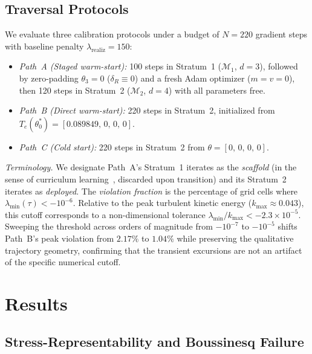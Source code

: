 \documentclass[preprint,aps,prb,longbibliography,superscriptaddress]{revtex4-2}
\begin{document}
\subsection{Traversal Protocols}\label{sec:protocols}

We evaluate three calibration protocols under a budget of $N = 220$ gradient
steps with baseline penalty $\lambda_{\mathrm{realiz}} = 150$:
\begin{itemize}
  \item \textit{Path~A (Staged warm-start):} 100 steps in Stratum~1
    ($\mathcal{M}_1$, $d=3$), followed by zero-padding $\theta_3 = 0$
    ($\delta_R \equiv 0$) and a fresh Adam optimizer ($m = v = 0$), then
    120 steps in Stratum~2 ($\mathcal{M}_2$, $d=4$) with all parameters free.
  \item \textit{Path~B (Direct warm-start):} 220 steps in Stratum~2,
    initialized from $T_e(\theta_0^*) = [0.089849,\, 0,\, 0,\, 0]$.
  \item \textit{Path~C (Cold start):} 220 steps in Stratum~2 from
    $\theta = [0,\, 0,\, 0,\, 0]$.
\end{itemize}

\emph{Terminology.} We designate Path~A's Stratum~1 iterates as the
\emph{scaffold} (in the sense of curriculum learning~\cite{Bengio2009}, discarded
upon transition) and its Stratum~2 iterates as \emph{deployed}. The \emph{violation fraction} is the percentage of grid
cells where $\lambda_{\min}(\tau) < -10^{-6}$. Relative to the peak turbulent
kinetic energy ($k_{\max} \approx 0.043$), this cutoff corresponds to a
non-dimensional tolerance $\lambda_{\min}/k_{\max} < -2.3\times 10^{-5}$.
Sweeping the threshold across orders of magnitude from $-10^{-7}$ to $-10^{-5}$
shifts Path~B's peak violation from $2.17\%$ to $1.04\%$ while preserving the
qualitative trajectory geometry, confirming that the transient excursions are
not an artifact of the specific numerical cutoff.

\section{Results}\label{sec:results}

\subsection{Stress-Representability and Boussinesq Failure}
\label{sec:representability_results}
\end{document}
